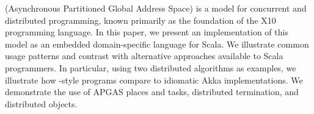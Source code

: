 \apgas (Asynchronous Partitioned Global Address Space) is a model for
concurrent and distributed programming, known primarily as the foundation of
the X10 programming language. In this paper, we present an implementation of
this model as an embedded domain-specific language for Scala. We illustrate
common usage patterns and contrast with alternative approaches available to
Scala programmers. In particular, using two distributed algorithms as examples, we
illustrate how \apgas-style programs compare to idiomatic Akka implementations.
We demonstrate the use of APGAS places and tasks, distributed termination, and distributed objects.
